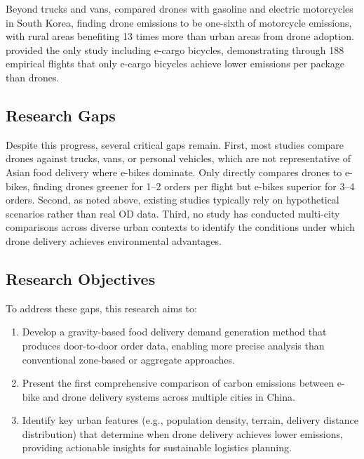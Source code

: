 \documentclass[11pt]{article}
\begin{document}
Beyond trucks and vans, \textcite{park_comparative_2018} compared drones with gasoline and electric motorcycles in South Korea, finding drone emissions to be one-sixth of motorcycle emissions, with rural areas benefiting 13 times more than urban areas from drone adoption. \textcite{rodrigues_drone_2022} provided the only study including e-cargo bicycles, demonstrating through 188 empirical flights that only e-cargo bicycles achieve lower emissions per package than drones.

\subsection{Research Gaps}

Despite this progress, several critical gaps remain. First, most studies compare drones against trucks, vans, or personal vehicles, which are not representative of Asian food delivery where e-bikes dominate. Only \textcite{li_beyond_2025} directly compares drones to e-bikes, finding drones greener for 1--2 orders per flight but e-bikes superior for 3--4 orders. Second, as noted above, existing studies typically rely on hypothetical scenarios rather than real OD data. Third, no study has conducted multi-city comparisons across diverse urban contexts to identify the conditions under which drone delivery achieves environmental advantages.

\subsection{Research Objectives}

To address these gaps, this research aims to:
\begin{enumerate}
  \item Develop a gravity-based food delivery demand generation method that produces door-to-door order data, enabling more precise analysis than conventional zone-based or aggregate approaches.
  \item Present the first comprehensive comparison of carbon emissions between e-bike and drone delivery systems across multiple cities in China.
  \item Identify key urban features (e.g., population density, terrain, delivery distance distribution) that determine when drone delivery achieves lower emissions, providing actionable insights for sustainable logistics planning.
\end{enumerate}
\end{document}
